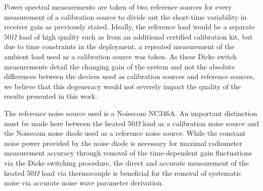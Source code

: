 Power spectral measurements are taken of two reference sources for every measurement of a calibration source to divide out the short-time variability in receiver gain as previously stated. Ideally, the reference load would be a separate $50 \Omega$ load of high quality such as from an additional certified calibration kit, but due to time constraints in the deployment, a repeated measurement of the ambient load used as a calibration source was taken. As these Dicke switch measurements detail the changing gain of the system \citep{edgesCal} and not the absolute differences between the devices used as calibration sources and reference sources, we believe that this degeneracy would not severely impact the quality of the results presented in this work.

The reference noise source used is a Noisecom NC346A. An important distinction must be made here between the heated $50 \Omega$ load as a calibration noise source and the Noisecom noise diode used as a reference noise source. While the constant noise power provided by the noise diode is necessary for maximal radiometer measurement accuracy through removal of the time-dependent gain fluctuations via the Dicke switching procedure, the direct and accurate measurement of the heated $50 \Omega$ load via thermocouple is beneficial for the removal of systematic noise via accurate noise wave parameter derivation. 

